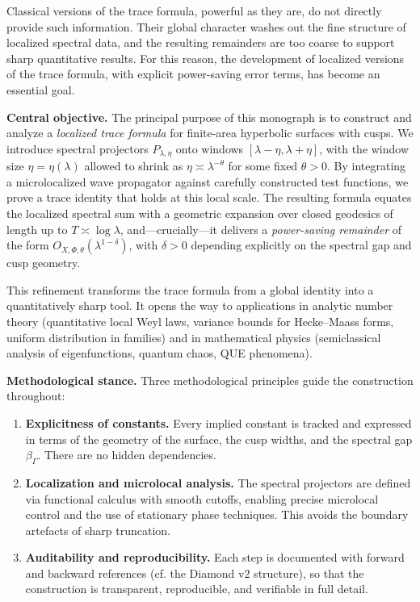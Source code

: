 Classical versions of the trace formula, powerful as they are, do not directly
provide such information. Their global character washes out the fine structure
of localized spectral data, and the resulting remainders are too coarse to
support sharp quantitative results. For this reason, the development of
localized versions of the trace formula, with explicit power-saving error
terms, has become an essential goal.

\medskip

\noindent\textbf{Central objective.}
The principal purpose of this monograph is to construct and analyze a
\emph{localized trace formula} for finite-area hyperbolic surfaces with cusps.
We introduce spectral projectors $P_{\lambda,\eta}$ onto windows
$[\lambda-\eta,\lambda+\eta]$, with the window size $\eta=\eta(\lambda)$ allowed
to shrink as $\eta\asymp \lambda^{-\theta}$ for some fixed $\theta>0$. By
integrating a microlocalized wave propagator against carefully constructed test
functions, we prove a trace identity that holds at this local scale. The
resulting formula equates the localized spectral sum with a geometric expansion
over closed geodesics of length up to $T\asymp\log \lambda$, and---crucially---it
delivers a \emph{power-saving remainder} of the form $O_{X,\Phi,\theta}(\lambda^{1-\delta})$,
with $\delta>0$ depending explicitly on the spectral gap and cusp geometry.

This refinement transforms the trace formula from a global identity into a
quantitatively sharp tool. It opens the way to applications in analytic number
theory (quantitative local Weyl laws, variance bounds for Hecke–Maass forms,
uniform distribution in families) and in mathematical physics (semiclassical
analysis of eigenfunctions, quantum chaos, QUE phenomena).

\medskip

\noindent\textbf{Methodological stance.}
Three methodological principles guide the construction throughout:

\begin{enumerate}[label=\arabic*.]
  \item \textbf{Explicitness of constants.} 
  Every implied constant is tracked and expressed in terms of the geometry of
  the surface, the cusp widths, and the spectral gap $\beta_\Gamma$. There are
  no hidden dependencies.

  \item \textbf{Localization and microlocal analysis.} 
  The spectral projectors are defined via functional calculus with smooth
  cutoffs, enabling precise microlocal control and the use of stationary phase
  techniques. This avoids the boundary artefacts of sharp truncation.

  \item \textbf{Auditability and reproducibility.} 
  Each step is documented with forward and backward references (cf. the Diamond
  v2 structure), so that the construction is transparent, reproducible, and
  verifiable in full detail.
\end{enumerate}

